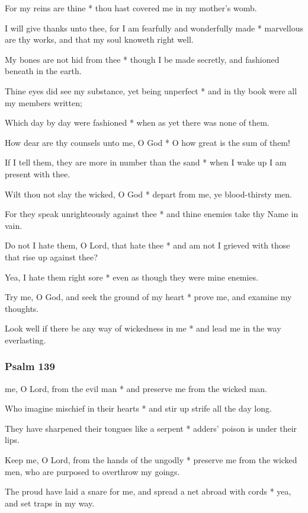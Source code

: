 For my reins are thine * thou hast covered me in my mother's womb.

I will give thanks unto thee, for I am fearfully and wonderfully made * marvellous are thy works, and that my soul knoweth right well.

My bones are not hid from thee * though I be made secretly, and fashioned beneath in the earth.

Thine eyes did see my substance, yet being unperfect * and in thy book were all my members written;

Which day by day were fashioned * when as yet there was none of them.

How dear are thy counsels unto me, O God * O how great is the sum of them!

If I tell them, they are more in number than the sand * when I wake up I am present with thee.

Wilt thou not slay the wicked, O God * depart from me, ye blood-thirsty men.

For they speak unrighteously against thee * and thine enemies take thy Name in vain.

Do not I hate them, O Lord, that hate thee * and am not I grieved with those that rise up against thee?

Yea, I hate them right sore * even as though they were mine enemies.

Try me, O God, and seek the ground of my heart * prove me, and examine my thoughts.

Look well if there be any way of wickedness in me * and lead me in the way everlasting.

\subsubsection{Psalm 139}


 me, O Lord, from the evil man * and preserve me from the wicked man.

Who imagine mischief in their hearts * and stir up strife all the day long.

They have sharpened their tongues like a serpent * adders' poison is under their lips.

Keep me, O Lord, from the hands of the ungodly * preserve me from the wicked men, who are purposed to overthrow my goings.

The proud have laid a snare for me, and spread a net abroad with cords * yea, and set traps in my way.

